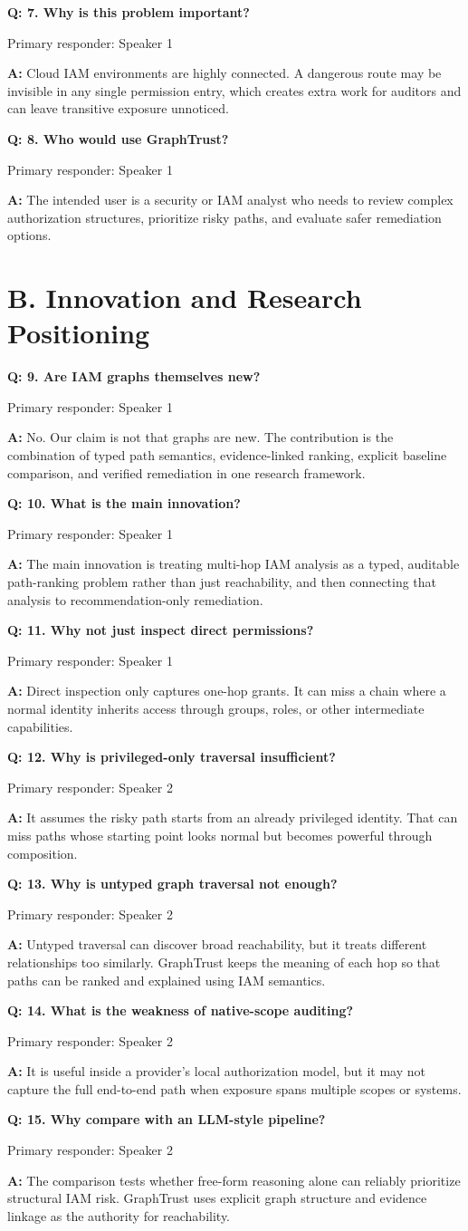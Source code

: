 \documentclass[11pt,a4paper]{article}
\newcommand{\q}[1]{\vspace{0.35em}\textbf{Q: #1}\par}
\newcommand{\a}[1]{\textbf{A:} #1\par}
\newcommand{\owner}[1]{\textcolor{Muted}{\small Primary responder: #1}\par}
\begin{document}
\q{7. Why is this problem important?}
\owner{Speaker 1}
\a{Cloud IAM environments are highly connected. A dangerous route may be invisible in any single permission entry, which creates extra work for auditors and can leave transitive exposure unnoticed.}

\q{8. Who would use GraphTrust?}
\owner{Speaker 1}
\a{The intended user is a security or IAM analyst who needs to review complex authorization structures, prioritize risky paths, and evaluate safer remediation options.}

\section*{B. Innovation and Research Positioning}

\q{9. Are IAM graphs themselves new?}
\owner{Speaker 1}
\a{No. Our claim is not that graphs are new. The contribution is the combination of typed path semantics, evidence-linked ranking, explicit baseline comparison, and verified remediation in one research framework.}

\q{10. What is the main innovation?}
\owner{Speaker 1}
\a{The main innovation is treating multi-hop IAM analysis as a typed, auditable path-ranking problem rather than just reachability, and then connecting that analysis to recommendation-only remediation.}

\q{11. Why not just inspect direct permissions?}
\owner{Speaker 1}
\a{Direct inspection only captures one-hop grants. It can miss a chain where a normal identity inherits access through groups, roles, or other intermediate capabilities.}

\q{12. Why is privileged-only traversal insufficient?}
\owner{Speaker 2}
\a{It assumes the risky path starts from an already privileged identity. That can miss paths whose starting point looks normal but becomes powerful through composition.}

\q{13. Why is untyped graph traversal not enough?}
\owner{Speaker 2}
\a{Untyped traversal can discover broad reachability, but it treats different relationships too similarly. GraphTrust keeps the meaning of each hop so that paths can be ranked and explained using IAM semantics.}

\q{14. What is the weakness of native-scope auditing?}
\owner{Speaker 2}
\a{It is useful inside a provider's local authorization model, but it may not capture the full end-to-end path when exposure spans multiple scopes or systems.}

\q{15. Why compare with an LLM-style pipeline?}
\owner{Speaker 2}
\a{The comparison tests whether free-form reasoning alone can reliably prioritize structural IAM risk. GraphTrust uses explicit graph structure and evidence linkage as the authority for reachability.}
\end{document}

